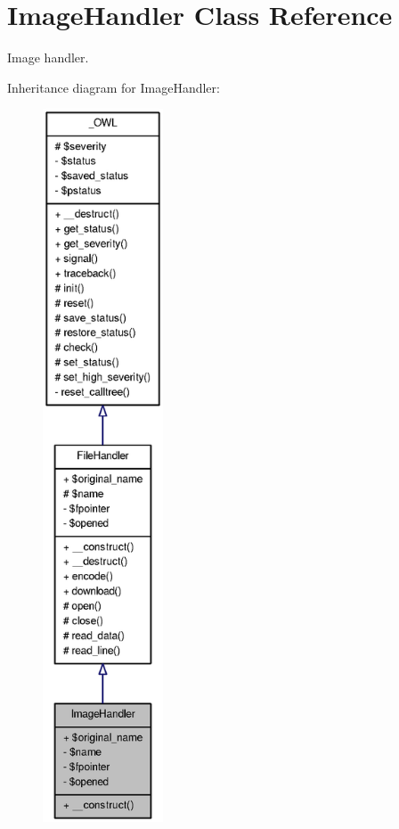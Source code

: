 \section{ImageHandler Class Reference}
\label{classImageHandler}


Image handler.  




Inheritance diagram for ImageHandler:\nopagebreak
\begin{figure}[H]
\begin{center}
\leavevmode
\includegraphics[height=600pt]{classImageHandler__inherit__graph}
\end{center}
\end{figure}



